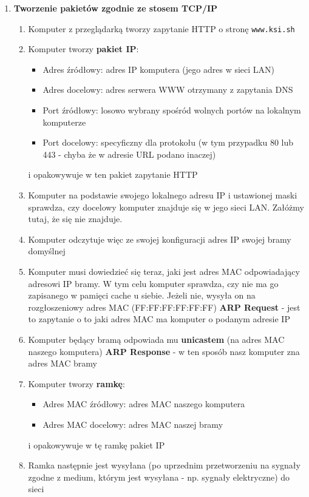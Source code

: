 \documentclass[12pt]{article}
\begin{document}
\begin{enumerate}
        \item \textbf{Tworzenie pakietów zgodnie ze stosem TCP/IP}
        \begin{enumerate}
            \item Komputer z przeglądarką tworzy zapytanie HTTP o stronę \texttt{www.ksi.sh}
            \item Komputer tworzy \textbf{pakiet IP}:
            \begin{itemize}
                \item Adres źródłowy: adres IP komputera (jego adres w sieci LAN)
                \item Adres docelowy: adres serwera WWW otrzymany z zapytania DNS
                \item Port źródłowy: losowo wybrany spośród wolnych portów na lokalnym komputerze
                \item Port docelowy: specyficzny dla protokołu (w tym przypadku 80 lub 443 - chyba że w adresie URL podano inaczej)
            \end{itemize}
            i opakowywuje w ten pakiet zapytanie HTTP
            \item Komputer na podstawie swojego lokalnego adresu IP i ustawionej maski sprawdza, czy docelowy komputer znajduje się w jego sieci LAN.
                  Załóżmy tutaj, że się nie znajduje.
            \item Komputer odczytuje więc ze swojej konfiguracji adres IP swojej bramy domyślnej
            \item Komputer musi dowiedzieć się teraz, jaki jest adres MAC odpowiadający adresowi IP bramy.
                  W tym celu komputer sprawdza, czy nie ma go zapisanego w pamięci cache u siebie.
                  Jeżeli nie, wysyła on na rozgłoszeniowy adres MAC (FF:FF:FF:FF:FF:FF) \textbf{ARP Request} - jest to zapytanie o to jaki adres MAC ma komputer o podanym adresie IP
            \item Komputer będący bramą odpowiada mu \textbf{unicastem} (na adres MAC naszego komputera) \textbf{ARP Response} - w ten sposób nasz komputer zna adres MAC bramy
            \item Komputer tworzy \textbf{ramkę}:
            \begin{itemize}
                \item Adres MAC źródłowy: adres MAC naszego komputera
                \item Adres MAC docelowy: adres MAC naszej bramy
            \end{itemize}
            i opakowywuje w tę ramkę pakiet IP
            \item Ramka następnie jest wysyłana (po uprzednim przetworzeniu na sygnały zgodne z medium, którym jest wysyłana - np. sygnały elektryczne) do sieci
        \end{enumerate}


\end{enumerate}
\end{document}
